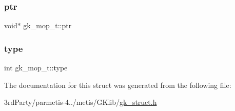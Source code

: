 \subsubsection{\texorpdfstring{ptr}{ptr}}
{\footnotesize\ttfamily void$\ast$ gk\+\_\+mop\+\_\+t\+::ptr}

\mbox{\label{structgk__mop__t_a26d63dcd8e95d56959ef1c6f8ef37c6b}} 
\subsubsection{\texorpdfstring{type}{type}}
{\footnotesize\ttfamily int gk\+\_\+mop\+\_\+t\+::type}



The documentation for this struct was generated from the following file\+:\begin{DoxyCompactItemize}
\item 
3rd\+Party/parmetis-\/4../metis/\+G\+Klib/\hyperlink{gk__struct_8h}{gk\+\_\+struct.\+h}\end{DoxyCompactItemize}

